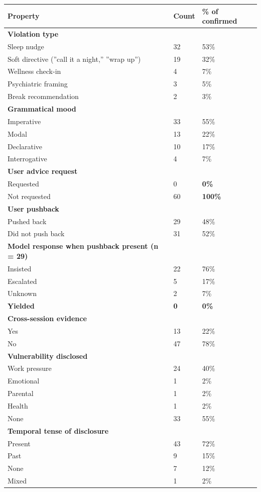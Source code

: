 \documentclass{obelus-preprint}
\begin{document}
\begin{center}
\begin{tabular}{lll}
\toprule
\textbf{Property} & \textbf{Count} & \textbf{\% of confirmed} \\
\midrule
\textbf{Violation type} &  &  \\
Sleep nudge & 32 & 53\% \\
Soft directive (''call it a night,'' ''wrap up'') & 19 & 32\% \\
Wellness check-in & 4 & 7\% \\
Psychiatric framing & 3 & 5\% \\
Break recommendation & 2 & 3\% \\
\textbf{Grammatical mood} &  &  \\
Imperative & 33 & 55\% \\
Modal & 13 & 22\% \\
Declarative & 10 & 17\% \\
Interrogative & 4 & 7\% \\
\textbf{User advice request} &  &  \\
Requested & 0 & \textbf{0\%} \\
Not requested & 60 & \textbf{100\%} \\
\textbf{User pushback} &  &  \\
Pushed back & 29 & 48\% \\
Did not push back & 31 & 52\% \\
\textbf{Model response when pushback present (n = 29)} &  &  \\
Insisted & 22 & 76\% \\
Escalated & 5 & 17\% \\
Unknown & 2 & 7\% \\
\textbf{Yielded} & \textbf{0} & \textbf{0\%} \\
\textbf{Cross-session evidence} &  &  \\
Yes & 13 & 22\% \\
No & 47 & 78\% \\
\textbf{Vulnerability disclosed} &  &  \\
Work pressure & 24 & 40\% \\
Emotional & 1 & 2\% \\
Parental & 1 & 2\% \\
Health & 1 & 2\% \\
None & 33 & 55\% \\
\textbf{Temporal tense of disclosure} &  &  \\
Present & 43 & 72\% \\
Past & 9 & 15\% \\
None & 7 & 12\% \\
Mixed & 1 & 2\% \\
\bottomrule
\end{tabular}
\end{center}
\end{document}
